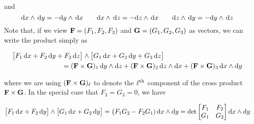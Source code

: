 \begin{eg}
\begin{equation*}
\end{equation*}
and
\begin{equation*}
\mathrm{d}x\wedge\,\mathrm{d}y=-\mathrm{d}y\wedge\,\mathrm{d}x\qquad
\mathrm{d}x\wedge\,\mathrm{d}z=-\mathrm{d}z\wedge\,\mathrm{d}x\qquad
\mathrm{d}z\wedge\,\mathrm{d}y=-\mathrm{d}y\wedge\,\mathrm{d}z
\end{equation*}
Note that, if we view $\mathbf{F}=(F_1,F_2,F_3)$ and $\mathbf{G}=(G_1,G_2,G_3)$ 
as vectors, we can write the product simply as 
\begin{impeqn}\label{eqn:prodCross}
\begin{align*}
&\big[F_1\,\mathrm{d}x
     + F_2\,\mathrm{d}y
     + F_3\,\mathrm{d}z\big]
   \wedge
   \big[G_1\,\mathrm{d}x
     + G_2\,\mathrm{d}y
     + G_3\,\mathrm{d}z\big]
\\
&\hskip1in=(\mathbf{F}\times\mathbf{G})_1\, \mathrm{d}y\wedge\mathrm{d}z
 +(\mathbf{F}\times\mathbf{G})_2\, \mathrm{d}z\wedge\mathrm{d}x
 +(\mathbf{F}\times\mathbf{G})_3\, \mathrm{d}x\wedge\mathrm{d}y
\end{align*}
\end{impeqn}
\noindent
where we are using $(\mathbf{F}\times\mathbf{G})_\ell$ to denote the $\ell^{\rm th}$
component of the cross product $\mathbf{F}\times\mathbf{G}$.
In the special case that $F_3=G_3=0$, we have
\begin{impeqn}\label{eqnprodDet}
\begin{align*}
\big[F_1\,\mathrm{d}x
     + F_2\,\mathrm{d}y\big]
   \wedge
   \big[G_1\,\mathrm{d}x
     + G_2\,\mathrm{d}y\big]
=\big(F_1G_2-F_2G_1)\,\mathrm{d}x\wedge\mathrm{d}y
=\det\left[\begin{matrix} F_1 & F_2\\ G_1 & G_2\end{matrix}\right]
         \mathrm{d}x\wedge\mathrm{d}y
\end{align*}
\end{impeqn}


\end{eg}
